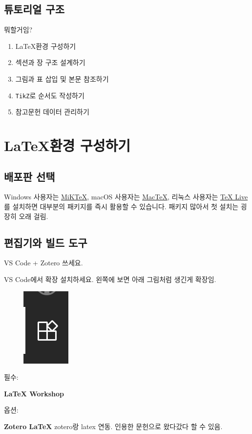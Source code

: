 \documentclass[doctor, korean]{pnuthesis_me}
\begin{document}
\section{튜토리얼 구조}
뭐할거임?
\begin{enumerate}[label=\arabic*.]
    \item \LaTeX 환경 구성하기
    \item 섹션과 장 구조 설계하기
    \item 그림과 표 삽입 및 본문 참조하기
    \item \texttt{TikZ}로 순서도 작성하기
    \item 참고문헌 데이터 관리하기
\end{enumerate}

\chapter{\LaTeX 환경 구성하기}
\section{배포판 선택}
Windows 사용자는 \href{https://miktex.org/}{MiKTeX}, macOS 사용자는 \href{https://tug.org/mactex/}{MacTeX}, 리눅스 사용자는 \href{https://www.tug.org/texlive/}{TeX Live}를 설치하면 대부분의 패키지를 즉시 활용할 수 있습니다.
패키지 많아서 첫 설치는 굉장히 오래 걸림.

\section{편집기와 빌드 도구}

VS Code + Zotero 쓰세요.

VS Code에서 확장 설치하세요.
왼쪽에 보면 아래 그림처럼 생긴게 확장임.
\begin{figure}[htbp]
    \centering
    \includegraphics{ext.png}
    \label{fig:ext}
\end{figure}

필수:

\textbf{LaTeX Workshop}

옵션:

\textbf{Zotero LaTeX} zotero랑 latex 연동. 인용한 문헌으로 왔다갔다 할 수 있음.
\end{document}
